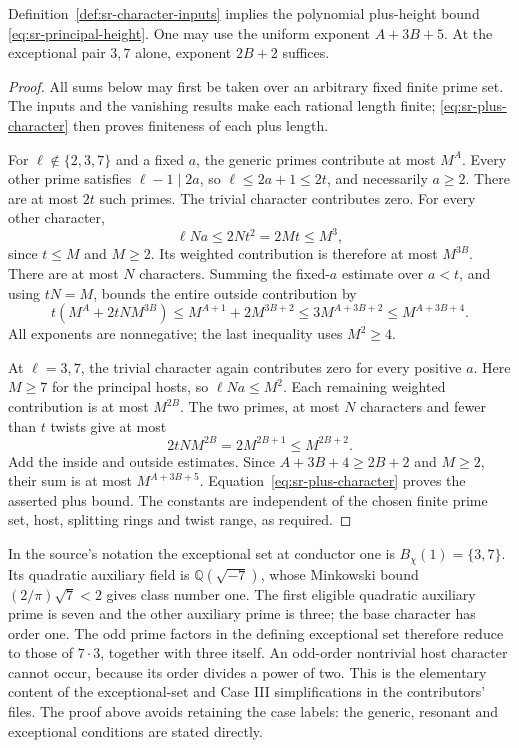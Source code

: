 \begin{srproposition}\label{prop:sr-two-counts}
Definition~\ref{def:sr-character-inputs} implies the polynomial
plus-height bound \eqref{eq:sr-principal-height}.
One may use the uniform exponent \(A+3B+5\).
At the exceptional pair \(3,7\) alone, exponent \(2B+2\) suffices.
\end{srproposition}
\begin{proof}
All sums below may first be taken over an arbitrary fixed finite
prime set. The inputs and the vanishing results make each rational
length finite; \eqref{eq:sr-plus-character} then proves finiteness
of each plus length.

For \(\ell\notin\{2,3,7\}\) and a fixed \(a\), the generic primes
contribute at most \(M^A\).
Every other prime satisfies \(\ell-1\mid2a\), so
\(\ell\leq2a+1\leq2t\), and necessarily \(a\geq2\).
There are at most \(2t\) such primes.
The trivial character contributes zero.
For every other character,
\[
 \ell N a\leq2Nt^2=2Mt\leq M^3,
\]
since \(t\leq M\) and \(M\geq2\).
Its weighted contribution is therefore at most \(M^{3B}\).
There are at most \(N\) characters.
Summing the fixed-\(a\) estimate over \(a<t\), and using \(tN=M\),
bounds the entire outside contribution by
\[
 t(M^A+2tN M^{3B})
 \leq M^{A+1}+2M^{3B+2}
 \leq3M^{A+3B+2}\leq M^{A+3B+4}.
\]
All exponents are nonnegative; the last inequality uses \(M^2\geq4\).

At \(\ell=3,7\), the trivial character again contributes zero for
every positive \(a\).
Here \(M\geq7\) for the principal hosts, so
\(\ell N a\leq M^2\).
Each remaining weighted contribution is at most \(M^{2B}\).
The two primes, at most \(N\) characters and fewer than \(t\)
twists give at most
\[
          2tN M^{2B}=2M^{2B+1}\leq M^{2B+2}.
\]
Add the inside and outside estimates.
Since \(A+3B+4\geq2B+2\) and \(M\geq2\), their sum is at most
\(M^{A+3B+5}\).
Equation~\eqref{eq:sr-plus-character} proves the asserted plus bound.
The constants are independent of the chosen finite prime set,
host, splitting rings and twist range, as required.
\end{proof}

In the source's notation the exceptional set at conductor one is
\(B_\chi(1)=\{3,7\}\).
Its quadratic auxiliary field is \(\mathbb Q(\sqrt{-7})\), whose
Minkowski bound \((2/\pi)\sqrt7<2\) gives class number one.
The first eligible quadratic auxiliary prime is seven and the
other auxiliary prime is three; the base character has order one.
The odd prime factors in the defining exceptional set therefore
reduce to those of \(7\cdot3\), together with three itself.
An odd-order nontrivial host character cannot occur, because its
order divides a power of two.
This is the elementary content of the exceptional-set and
Case III simplifications in the contributors' files.
The proof above avoids retaining the case labels: the generic,
resonant and exceptional conditions are stated directly.

